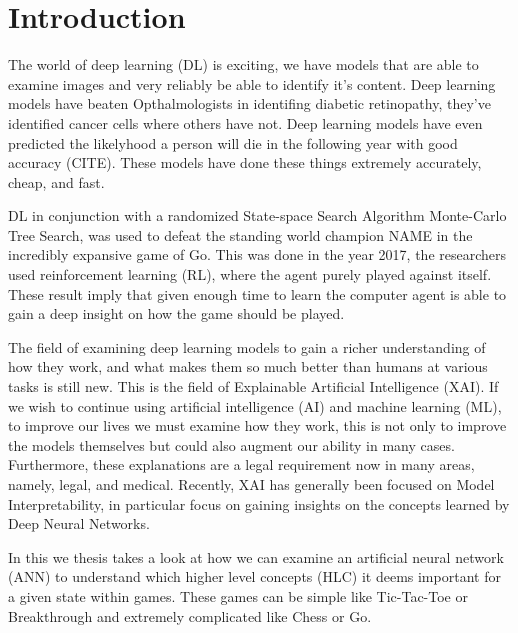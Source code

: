 \chapter{Introduction\label{cha:introduction}}


The world of deep learning (DL) is exciting, we have models that are able to examine
images and very reliably be able to identify it's content. Deep learning models have
beaten Opthalmologists in identifing diabetic retinopathy, they've identified
cancer cells where others have not. Deep learning models have even predicted
the likelyhood a person will die in the following year with good accuracy (CITE).
These models have done these things extremely accurately, cheap, and fast.

DL in conjunction with a randomized State-space Search Algorithm Monte-Carlo Tree Search, 
was used to defeat the standing world champion NAME in the incredibly expansive game of Go. This was done in the year 
2017, the researchers used reinforcement learning (RL), where the agent purely played against itself. 
These result imply that given enough time to learn the computer agent is able to
gain a deep insight on how the game should be played.  

The field of examining deep learning models to gain a richer understanding
of how they work, and what makes them so much better than humans at various tasks
is still new. This is the field of Explainable Artificial Intelligence (XAI).
If we wish to continue using artificial intelligence (AI) and machine learning (ML),
to improve our lives we must examine how they work, this is not only to improve
the models themselves but could also augment our ability in many cases.
Furthermore, these explanations are a legal requirement now in many areas, namely, legal, and
medical. Recently, XAI has generally been focused on Model Interpretability, in
particular focus on gaining insights on the concepts learned by Deep Neural Networks.

In this we thesis takes a look at how we can examine an artificial neural network (ANN)
to understand which higher level concepts (HLC) it deems important for a given state
within games. These games can be simple like Tic-Tac-Toe or Breakthrough and extremely
complicated like Chess or Go. 

